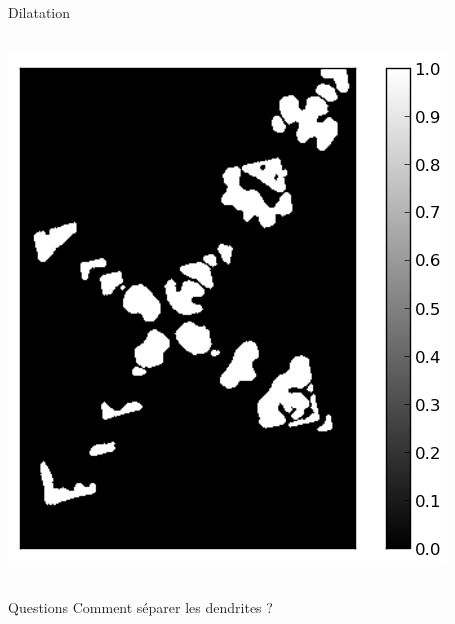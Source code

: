 \documentclass[8pt,a4paper]{beamer}
\begin{document}
\begin{frame}{Dilatation}
 \begin{columns}
\includegraphics[width=1.\textwidth]{figures/image_dilation.png}

\end{columns}
\begin{alertblock}{Questions}
Comment séparer les dendrites ?
\end{alertblock}
\end{frame}
\end{document}
